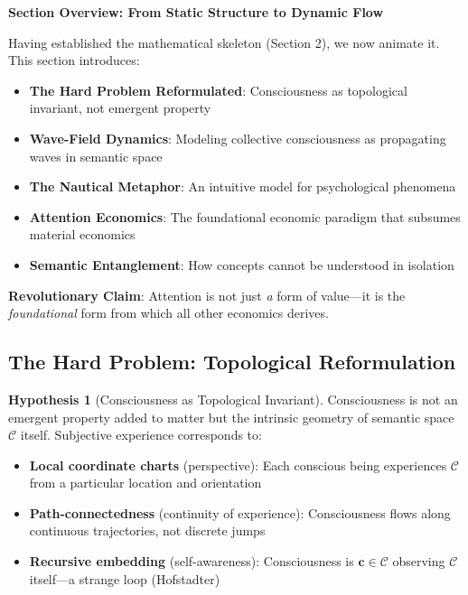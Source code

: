 \documentclass[11pt,a4paper]{article}
\theoremstyle{definition}
\newtheorem{hypothesis}{Hypothesis}[section]
\theoremstyle{remark}
\newcommand{\CC}{\mathcal{C}}
\newcommand{\cc}{\mathbf{c}}
\begin{document}
\begin{mdframed}[backgroundcolor=cyan!5,linewidth=2pt]
\textbf{Section Overview: From Static Structure to Dynamic Flow}

Having established the mathematical skeleton (Section 2), we now animate it. This section introduces:

\begin{itemize}[nosep]
    \item \textbf{The Hard Problem Reformulated}: Consciousness as topological invariant, not emergent property
    \item \textbf{Wave-Field Dynamics}: Modeling collective consciousness as propagating waves in semantic space
    \item \textbf{The Nautical Metaphor}: An intuitive model for psychological phenomena
    \item \textbf{Attention Economics}: The foundational economic paradigm that subsumes material economics
    \item \textbf{Semantic Entanglement}: How concepts cannot be understood in isolation
\end{itemize}

\textbf{Revolutionary Claim}: Attention is not just \textit{a} form of value—it is the \textit{foundational} form from which all other economics derives.
\end{mdframed}

\subsection{The Hard Problem: Topological Reformulation}

\begin{hypothesis}[Consciousness as Topological Invariant]
Consciousness is not an emergent property added to matter but the intrinsic geometry of semantic space \(\CC\) itself. Subjective experience corresponds to:
\begin{itemize}
\item \textbf{Local coordinate charts} (perspective): Each conscious being experiences \(\CC\) from a particular location and orientation
\item \textbf{Path-connectedness} (continuity of experience): Consciousness flows along continuous trajectories, not discrete jumps
\item \textbf{Recursive embedding} (self-awareness): Consciousness is \(\cc \in \CC\) observing \(\CC\) itself—a strange loop (Hofstadter)
\end{itemize}
\end{hypothesis}
\end{document}
